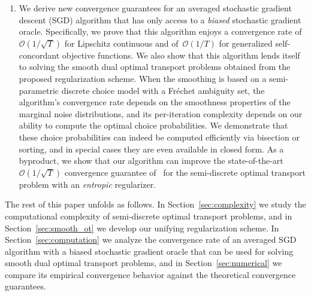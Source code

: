 \documentclass[11pt, a4paper, oneside, reqno]{article}
\begin{document}
\begin{enumerate}[label=\roman*.]
		\item We derive new convergence guarantees for an averaged stochastic gradient descent (SGD) algorithm that has only access to a {\em biased} stochastic gradient oracle. Specifically, we prove that this algorithm enjoys a convergence rate of $\mathcal O(1/\sqrt{T})$ for Lipschitz continuous and of~$\mathcal O(1/T)$ for generalized self-concordant objective functions. We also show that this algorithm lends itself to solving the smooth dual optimal transport problems obtained from the proposed regularization scheme. When the smoothing is based on a semi-parametric discrete choice model with a Fr\'echet ambiguity set, the algorithm's convergence rate depends on the smoothness properties of the marginal noise distributions, and its per-iteration complexity depends on our ability to compute the optimal choice probabilities. We demonstrate that these choice probabilities can indeed be computed efficiently via bisection or sorting, and in special cases they are even available in closed form. As a byproduct, we show that our algorithm can improve the state-of-the-art $\mathcal O(1/\sqrt{T})$ convergence guarantee of~\citet{genevay2016stochastic} for the semi-discrete optimal transport problem with an {\em entropic} regularizer.
	\end{enumerate}
	
	The rest of this paper unfolds as follows. In Section~\ref{sec:complexity} we study the computational complexity of semi-discrete optimal transport problems, and in Section~\ref{sec:smooth_ot} we develop our unifying regularization scheme.
	In Section~\ref{sec:computation} we analyze the convergence rate of an averaged SGD algorithm with a biased stochastic gradient oracle that can be used for solving smooth dual optimal transport problems, and in Section~\ref{sec:numerical} we compare its empirical convergence behavior against the theoretical convergence guarantees.
	
\end{document}
